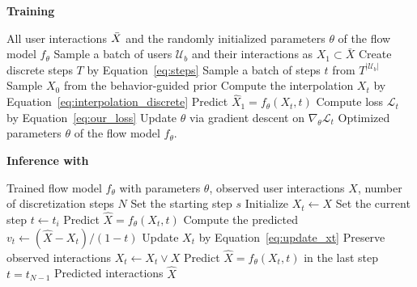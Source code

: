 \documentclass[sigconf]{acmart}
\begin{document}
\begin{algorithm}[H]
	\caption{\textbf{Training \ours}}  
	\label{algo:training}
	\begin{algorithmic}[1]
		\Require All user interactions $\Bar X$ and the randomly initialized parameters $\theta$ of the flow model $f_\theta$
            \Repeat 
            \State Sample a batch of users $\mathcal U_b$ and their interactions as $X_1 \subset \bar X$
            \State Create discrete steps $T$ by Equation~\ref{eq:steps}
            \State Sample a batch of steps $t$ from $T^{|\mathcal U_b|}$
            \State Sample $X_0$ from the behavior-guided prior 
            \State Compute the interpolation $X_t$ by Equation~\ref{eq:interpolation_discrete}
            \State Predict $\hat X_1 = f_\theta(X_t, t)$
            \State Compute loss $\mathcal L_t$ by Equation~\ref{eq:our_loss}
            \State Update $\theta$ via gradient descent on $\nabla_\theta\mathcal L_t$
            \Ensure Optimized parameters $\theta$ of the flow model $f_\theta$.
	\end{algorithmic}
\end{algorithm}
\setlength{\textfloatsep}{0.28cm}

\begin{algorithm}[H]
	\caption{\textbf{Inference with \ours}}  
	\label{algo:inference}
	\begin{algorithmic}[1]
		\Require Trained flow model $f_\theta$ with parameters $\theta$, observed user interactions $X$, number of discretization steps $N$
        \State Set the starting step $s$ 
        \State Initialize $X_t \gets X$
        	\State Set the current step $t \gets t_i$
            \State Predict $\hat{X} = f_\theta(X_t, t)$ 
            \State Compute the predicted $v_t \gets (\hat{X} - X_t) / (1 - t)$
            \State Update $X_t$ by Equation~\ref{eq:update_xt}
            \State Preserve observed interactions $X_t \gets X_t \vee X$
        \EndFor
        \State Predict $\hat X = f_\theta(X_t, t)$ in the last step $t = t_{N-1}$
        \Ensure Predicted interactions $\hat X$
	\end{algorithmic}
\end{algorithm}
\end{document}
